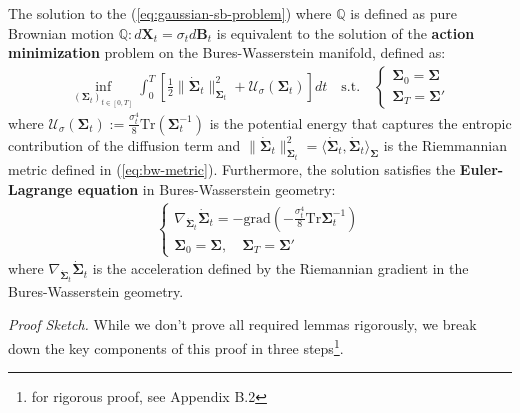 \documentclass{article}
\begin{document}
\begin{proposition}
    The solution to the (\ref{eq:gaussian-sb-problem}) where $\mathbb{Q}$ is defined as pure Brownian motion $\mathbb{Q}:d\boldsymbol{X}_t=\sigma_td\boldsymbol{B}_t$ is equivalent to the solution of the \textbf{action minimization} problem on the Bures-Wasserstein manifold, defined as: 
    \begin{align}
        \inf_{(\boldsymbol{\Sigma}_t)_{t\in [0,T]}}\int_0^T\left[\frac{1}{2}\|\dot{\boldsymbol{\Sigma}}_t\|^2_{\boldsymbol{\Sigma}_t}+\mathcal{U}_\sigma(\boldsymbol{\Sigma}_t)\right]dt\quad\text{s.t.}\quad \begin{cases}
            \boldsymbol{\Sigma}_0=\boldsymbol{\Sigma}\\
            \boldsymbol{\Sigma}_T=\boldsymbol{\Sigma}'
        \end{cases}\label{eq:gaussian-action-functional}
    \end{align}
    where $\mathcal{U}_\sigma(\boldsymbol{\Sigma}_t):= \frac{\sigma_t^4}{8}\text{Tr}\left(\boldsymbol{\Sigma}_t^{-1}\right)$ is the potential energy that captures the entropic contribution of the diffusion term and $\|\dot{\boldsymbol{\Sigma}}_t\|^2_{\boldsymbol{\Sigma}_t}=\langle \dot{\boldsymbol{\Sigma}}_t, \dot{\boldsymbol{\Sigma}}_t\rangle_{\boldsymbol{\Sigma}}$ is the Riemmannian metric defined in (\ref{eq:bw-metric}). Furthermore, the solution satisfies the \textbf{Euler-Lagrange equation} in Bures-Wasserstein geometry:
    \begin{align}
    \begin{cases}
        \nabla_{\dot{\boldsymbol{\Sigma}}_t}\dot{\boldsymbol{\Sigma}}_t=-\text{grad}\left(-\frac{\sigma_t^4}{8}\text{Tr}\boldsymbol{\Sigma}_t^{-1}\right)\\
        \boldsymbol{\Sigma}_0=\boldsymbol{\Sigma}, \quad \boldsymbol{\Sigma}_T=\boldsymbol{\Sigma}'
    \end{cases}\tag{Euler-Lagrange Equation}\label{eq:euler-lagrange-bures}
    \end{align}
    where $\nabla_{\dot{\boldsymbol{\Sigma}}_t}\dot{\boldsymbol{\Sigma}}_t$ is the acceleration defined by the Riemannian gradient in the Bures-Wasserstein geometry.
\end{proposition}

\textit{Proof Sketch.} While we don't prove all required lemmas rigorously, we break down the key components of this proof in three steps\footnote{for rigorous proof, see \citep{bunne2023schrodinger} Appendix B.2}.
\end{document}
